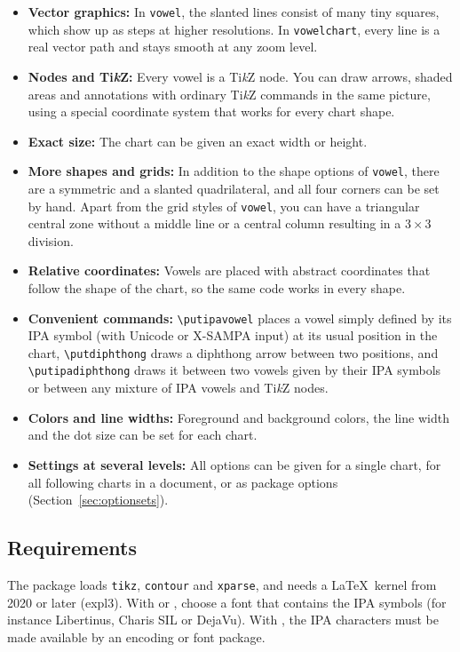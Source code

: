 \documentclass[a4paper,11pt]{article}
\newcommand\cmd[1]{\texttt{\textbackslash #1}}
\newcommand\pkg[1]{\texttt{#1}}
\begin{document}
\begin{itemize}
	\item
		\textbf{Vector graphics:} In \pkg{vowel}, the slanted lines consist of many tiny squares, which show up as steps at higher resolutions. In \pkg{vowelchart}, every line is a real vector path and stays smooth at any zoom level.
	\item
		\textbf{Nodes and Ti\textit{k}Z:} Every vowel is a Ti\textit{k}Z node. You can draw arrows, shaded areas and annotations with ordinary Ti\textit{k}Z commands in the same picture, using a special coordinate system that works for every chart shape.
	\item
		\textbf{Exact size:} The chart can be given an exact width or height.
	\item
		\textbf{More shapes and grids:} In addition to the shape options of \pkg{vowel}, there are a symmetric and a slanted quadrilateral, and all four corners can be set by hand. Apart from the grid styles of \pkg{vowel}, you can have a triangular central zone without a middle line or a central column resulting in a 3\,×\,3 division.
	\item
		\textbf{Relative coordinates:} Vowels are placed with abstract coordinates that follow the shape of the chart, so the same code works in every shape.
	\item
		\textbf{Convenient commands:} \cmd{putipavowel} places a vowel simply defined by its IPA symbol (with Unicode or X-SAMPA input) at its usual position in the chart, \cmd{putdiphthong} draws a diphthong arrow between two positions, and \cmd{putipadiphthong} draws it between two vowels given by their IPA symbols or between any mixture of IPA vowels and Ti\textit{k}Z nodes.
	\item
		\textbf{Colors and line widths:} Foreground and background colors, the line width and the dot size can be set for each chart.
	\item
		\textbf{Settings at several levels:} All options can be given for a single chart, for all following charts in a document, or as package options (Section~\ref{sec:optionsets}).
\end{itemize}




\subsection{Requirements}

The package loads \pkg{tikz}, \pkg{contour} and \pkg{xparse}, and needs a \LaTeX\ kernel from 2020 or later (expl3). With  or , choose a font that contains the IPA symbols (for instance Libertinus, Charis SIL or DejaVu). With , the IPA characters must be made available by an encoding or font package.
\end{document}
